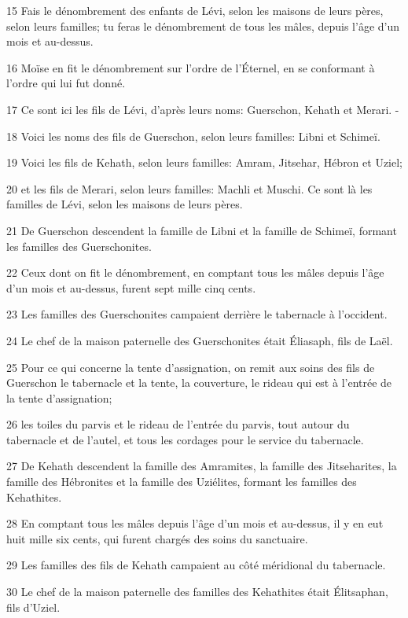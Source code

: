 \par 15 Fais le dénombrement des enfants de Lévi, selon les maisons de leurs pères, selon leurs familles; tu feras le dénombrement de tous les mâles, depuis l'âge d'un mois et au-dessus.
\par 16 Moïse en fit le dénombrement sur l'ordre de l'Éternel, en se conformant à l'ordre qui lui fut donné.
\par 17 Ce sont ici les fils de Lévi, d'après leurs noms: Guerschon, Kehath et Merari. -
\par 18 Voici les noms des fils de Guerschon, selon leurs familles: Libni et Schimeï.
\par 19 Voici les fils de Kehath, selon leurs familles: Amram, Jitsehar, Hébron et Uziel;
\par 20 et les fils de Merari, selon leurs familles: Machli et Muschi. Ce sont là les familles de Lévi, selon les maisons de leurs pères.
\par 21 De Guerschon descendent la famille de Libni et la famille de Schimeï, formant les familles des Guerschonites.
\par 22 Ceux dont on fit le dénombrement, en comptant tous les mâles depuis l'âge d'un mois et au-dessus, furent sept mille cinq cents.
\par 23 Les familles des Guerschonites campaient derrière le tabernacle à l'occident.
\par 24 Le chef de la maison paternelle des Guerschonites était Éliasaph, fils de Laël.
\par 25 Pour ce qui concerne la tente d'assignation, on remit aux soins des fils de Guerschon le tabernacle et la tente, la couverture, le rideau qui est à l'entrée de la tente d'assignation;
\par 26 les toiles du parvis et le rideau de l'entrée du parvis, tout autour du tabernacle et de l'autel, et tous les cordages pour le service du tabernacle.
\par 27 De Kehath descendent la famille des Amramites, la famille des Jitseharites, la famille des Hébronites et la famille des Uziélites, formant les familles des Kehathites.
\par 28 En comptant tous les mâles depuis l'âge d'un mois et au-dessus, il y en eut huit mille six cents, qui furent chargés des soins du sanctuaire.
\par 29 Les familles des fils de Kehath campaient au côté méridional du tabernacle.
\par 30 Le chef de la maison paternelle des familles des Kehathites était Élitsaphan, fils d'Uziel.
